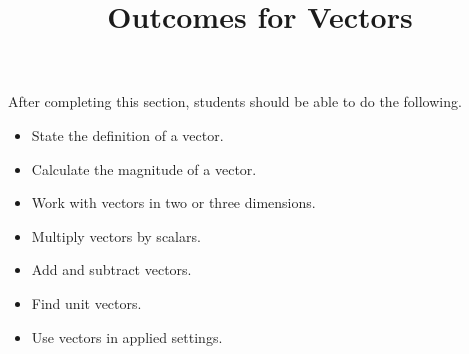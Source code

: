 \documentclass{ximera}
\title{Outcomes for Vectors}
\begin{document}
\begin{abstract}
\end{abstract}

\maketitle

\begin{sectionOutcomes}

After completing this section, students should be able to do the following.

\begin{itemize}
\item State the definition of a vector.
\item Calculate the magnitude of a vector.
\item Work with vectors in two or three dimensions.
\item Multiply vectors by scalars. 
\item Add and subtract vectors.
\item Find unit vectors.
\item Use vectors in applied settings.
\end{itemize}

\end{sectionOutcomes}
\end{document}
